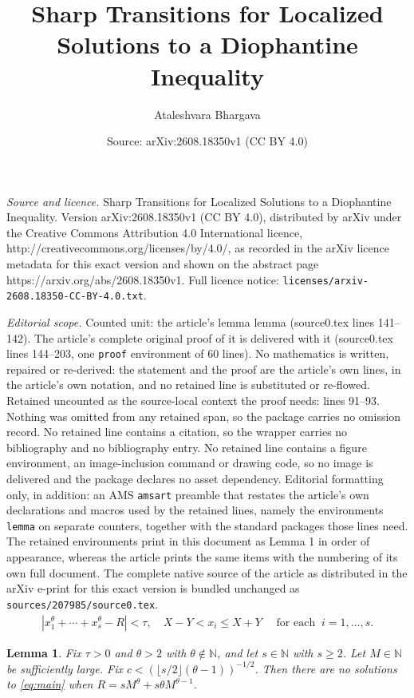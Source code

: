 \documentclass[10pt,a4paper]{amsart}
\title{Sharp Transitions for Localized Solutions to a Diophantine Inequality}
\author{Ataleshvara Bhargava}
\date{Source: arXiv:2608.18350v1 (CC BY 4.0)}
\newtheorem{lemma}{Lemma}
\begin{document}
\maketitle

\noindent\emph{Source and licence.} Sharp Transitions for Localized Solutions to a Diophantine Inequality. Version arXiv:2608.18350v1 (CC BY 4.0), distributed by arXiv under the Creative Commons Attribution 4.0 International licence, http://creativecommons.org/licenses/by/4.0/, as recorded in the arXiv licence metadata for this exact version and shown on the abstract page https://arxiv.org/abs/2608.18350v1. Full licence notice: \texttt{licenses/arxiv-2608.18350-CC-BY-4.0.txt}.\par\smallskip

\noindent\textit{Editorial scope.} Counted unit: the article's lemma lemma (source0.tex lines 141--142). The article's complete original proof of it is delivered with it (source0.tex lines 144--203, one \texttt{proof} environment of 60 lines). No mathematics is written, repaired or re-derived: the statement and the proof are the article's own lines, in the article's own notation, and no retained line is substituted or re-flowed.  Retained uncounted as the source-local context the proof needs: lines 91--93.  Nothing was omitted from any retained span, so the package carries no omission record.  No retained line contains a citation, so the wrapper carries no bibliography and no bibliography entry.  No retained line contains a figure environment, an image-inclusion command or drawing code, so no image is delivered and the package declares no asset dependency.  Editorial formatting only, in addition: an AMS \texttt{amsart} preamble that restates the article's own declarations and macros used by the retained lines, namely the environments \texttt{lemma} on separate counters, together with the standard packages those lines need.  The retained environments print in this document as Lemma 1 in order of appearance, whereas the article prints the same items with the numbering of its own full document.  The complete native source of the article as distributed in the arXiv e-print for this exact version is bundled unchanged as \texttt{sources/207985/source0.tex}.
\begin{align} \label{eq:main}
|x_1^{\theta} + \cdots +x_s^{\theta} - R| < \tau, \quad X-Y < x_i \leq X+Y \quad \text{ for each } \ i = 1, \ldots, s.
\end{align}

\begin{lemma} Fix $\tau > 0$ and $\theta > 2$ with $\theta \notin \mathbb{N}$, and let $s \in \mathbb{N}$ with $s \geq 2$. Let $M \in \mathbb{N}$ be sufficiently large. Fix $c < (\lfloor s/2 \rfloor (\theta-1))^{-1/2} $. Then there are no solutions to \eqref{eq:main} when $R = sM^{\theta}+s\theta M^{\theta-1}$. 
\end{lemma} 
\end{document}
